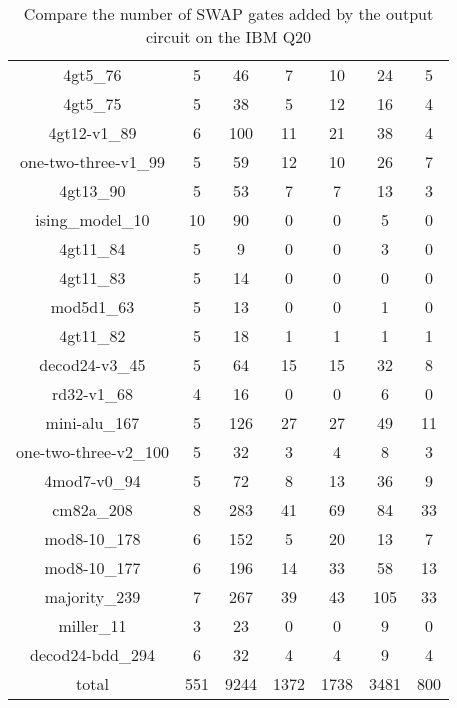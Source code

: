 \documentclass[runningheads]{llncs}
\begin{document}
\begin{table}[H]
\begin{center}
\begin{tabular}{|c|c|c|c|c|c|c|}
4gt5\_76 & 5 & 46 & 7 & 10 & 24 & 5 \\ 
4gt5\_75 & 5 & 38 & 5 & 12 & 16 & 4 \\ 
4gt12-v1\_89 & 6 & 100 & 11 & 21 & 38 & 4 \\ 
one-two-three-v1\_99 & 5 & 59 & 12 & 10 & 26 & 7 \\ 
4gt13\_90 & 5 & 53 & 7 & 7 & 13 & 3 \\ 
ising\_model\_10 & 10 & 90 & 0 & 0 & 5 & 0 \\ 
4gt11\_84 & 5 & 9 & 0 & 0 & 3 & 0 \\ 
4gt11\_83 & 5 & 14 & 0 & 0 & 0 & 0 \\ 
mod5d1\_63 & 5 & 13 & 0 & 0 & 1 & 0 \\ 
4gt11\_82 & 5 & 18 & 1 & 1 & 1 & 1 \\ 
decod24-v3\_45 & 5 & 64 & 15 & 15 & 32 & 8 \\ 
rd32-v1\_68 & 4 & 16 & 0 & 0 & 6 & 0 \\ 
mini-alu\_167 & 5 & 126 & 27 & 27 & 49 & 11 \\ 
one-two-three-v2\_100 & 5 & 32 & 3 & 4 & 8 & 3 \\ 
4mod7-v0\_94 & 5 & 72 & 8 & 13 & 36 & 9 \\ 
cm82a\_208 & 8 & 283 & 41 & 69 & 84 & 33 \\ 
mod8-10\_178 & 6 & 152 & 5 & 20 & 13 & 7 \\ 
mod8-10\_177 & 6 & 196 & 14 & 33 & 58 & 13 \\ 
majority\_239 & 7 & 267 & 39 & 43 & 105 & 33 \\ 
miller\_11 & 3 & 23 & 0 & 0 & 9 & 0 \\ 
decod24-bdd\_294 & 6 & 32 & 4 & 4 & 9 & 4 \\ 
\hline
total & 551 & 9244 & 1372 & 1738 & 3481 & 800 \\
		\hline
		\end{tabular} 
		\end{center} 
		\caption{Compare the number of SWAP gates added by the 
		output circuit on the IBM Q20 } 
		\label{tab3}
		\end{table}	
\end{document}
